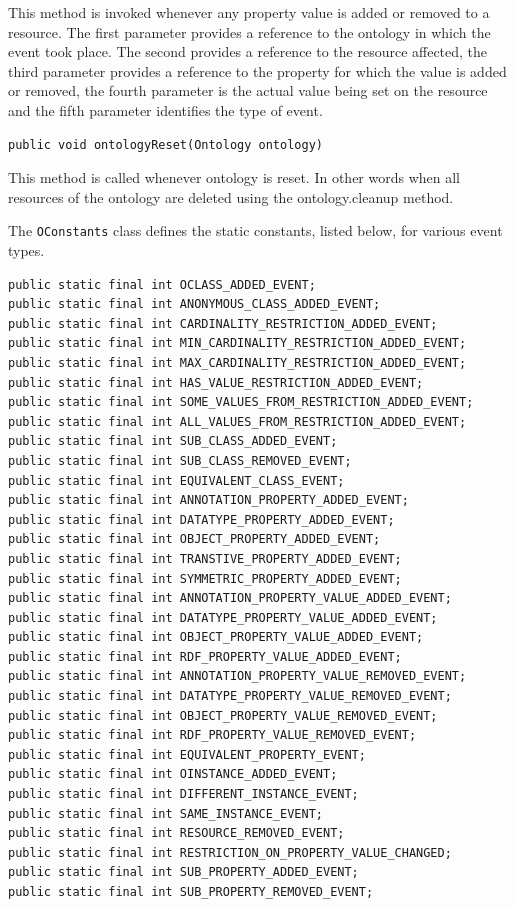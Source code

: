 This method is invoked whenever any property value is added or removed to a resource.
The first parameter provides a reference to the ontology in which the event took
place. The second provides a reference to the resource affected, the third parameter provides
a reference to the property for which the value is added or removed, the fourth parameter is
the actual value being set on the resource and the fifth parameter identifies the type of event.
\begin{small}\begin{verbatim}
public void ontologyReset(Ontology ontology)
\end{verbatim}\end{small}
This method is called whenever ontology is reset.  In other words when all resources of the 
ontology are deleted using the ontology.cleanup method.

The \texttt{OConstants} class defines the static constants, listed below, for various event types.
\begin{small}\begin{verbatim}
public static final int OCLASS_ADDED_EVENT;
public static final int ANONYMOUS_CLASS_ADDED_EVENT;
public static final int CARDINALITY_RESTRICTION_ADDED_EVENT;
public static final int MIN_CARDINALITY_RESTRICTION_ADDED_EVENT;
public static final int MAX_CARDINALITY_RESTRICTION_ADDED_EVENT;
public static final int HAS_VALUE_RESTRICTION_ADDED_EVENT;
public static final int SOME_VALUES_FROM_RESTRICTION_ADDED_EVENT;
public static final int ALL_VALUES_FROM_RESTRICTION_ADDED_EVENT;
public static final int SUB_CLASS_ADDED_EVENT;
public static final int SUB_CLASS_REMOVED_EVENT;
public static final int EQUIVALENT_CLASS_EVENT;
public static final int ANNOTATION_PROPERTY_ADDED_EVENT;
public static final int DATATYPE_PROPERTY_ADDED_EVENT;
public static final int OBJECT_PROPERTY_ADDED_EVENT;
public static final int TRANSTIVE_PROPERTY_ADDED_EVENT;
public static final int SYMMETRIC_PROPERTY_ADDED_EVENT;
public static final int ANNOTATION_PROPERTY_VALUE_ADDED_EVENT;
public static final int DATATYPE_PROPERTY_VALUE_ADDED_EVENT;
public static final int OBJECT_PROPERTY_VALUE_ADDED_EVENT;
public static final int RDF_PROPERTY_VALUE_ADDED_EVENT;
public static final int ANNOTATION_PROPERTY_VALUE_REMOVED_EVENT;
public static final int DATATYPE_PROPERTY_VALUE_REMOVED_EVENT;
public static final int OBJECT_PROPERTY_VALUE_REMOVED_EVENT;
public static final int RDF_PROPERTY_VALUE_REMOVED_EVENT;
public static final int EQUIVALENT_PROPERTY_EVENT;
public static final int OINSTANCE_ADDED_EVENT;  
public static final int DIFFERENT_INSTANCE_EVENT;
public static final int SAME_INSTANCE_EVENT;
public static final int RESOURCE_REMOVED_EVENT;
public static final int RESTRICTION_ON_PROPERTY_VALUE_CHANGED;
public static final int SUB_PROPERTY_ADDED_EVENT;
public static final int SUB_PROPERTY_REMOVED_EVENT;
\end{verbatim}\end{small}

